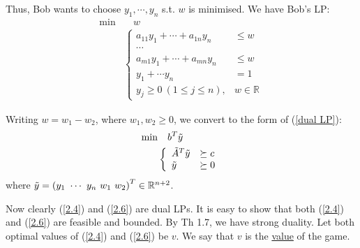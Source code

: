 Thus, Bob wants to choose $y_1, \cdots, y_n$ s.t. $w$ is minimised. We have Bob's LP:
\begin{align}
    \min & \quad w \nonumber \\
    & \left\lbrace\begin{array}{cl}
        a_{11}y_1 + \cdots + a_{1n}y_n &\leqslant w  \\
        \cdots & \\
        a_{m1}y_1 + \cdots + a_{mn}y_n &\leqslant w \\
        y_1 + \cdots y_n & = 1 \\
        y_j\geqslant 0\ (1\leqslant j\leqslant n), & w\in \mathbb{R} 
    \end{array} \right.\label{2.5}
\end{align}

Writing $w=w_1-w_2$, where $w_1, w_2\geqslant 0$, we convert to the form of (\ref{dual LP}):
\begin{align}
    \min & \quad b^T\Tilde{y} \nonumber \\
    & \left\lbrace\begin{array}{ll}
        \Tilde{A}^T\Tilde{y} & \succeq c  \\
        \Tilde{y} &\succeq 0
    \end{array} \right. \label{2.6}
\end{align}
where $\Tilde{y} = \left( y_1\ \cdots \ y_n \ w_1 \ w_2\right)^T\in\mathbb{R}^{n+2}$.

Now clearly (\ref{2.4}) and (\ref{2.6}) are dual LPs. It is easy to show that both (\ref{2.4}) and (\ref{2.6}) are feasible and bounded. By Th 1.7, we have strong duality. Let both optimal values of (\ref{2.4}) and (\ref{2.6}) be $v$. We say that $v$ is the \uline{value} of the game.

